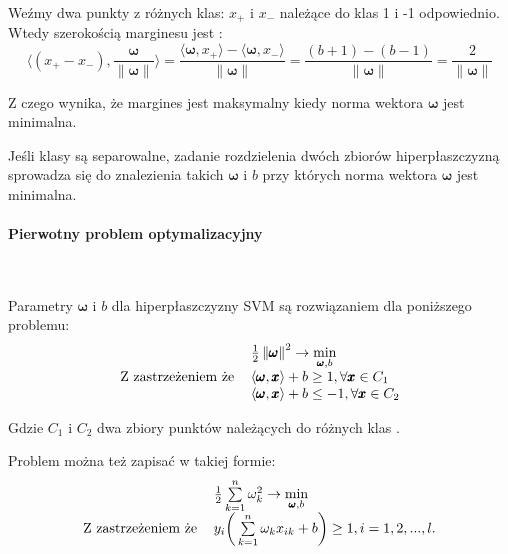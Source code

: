 \documentclass[paper=a4, fontsize=11pt]{scrartcl} %
\numberwithin{equation}{section} %
\numberwithin{figure}{section} %
\newcommand{\norm}[1]{\left\lVert#1\right\rVert}
\newcommand{\myparagraph}[1]{\paragraph{#1}\mbox{}\\}
\begin{document}
    Weźmy dwa punkty z różnych klas: $x_+$ i $x_-$ należące do klas 1 i -1 odpowiednio. Wtedy
    szerokością marginesu jest \cite{woroncow2007lekcii}:
    \begin{equation}
        \bigg\langle (x_+ - x_-), \frac{\pmb{\omega}}{\norm{\pmb{\omega}}} \bigg\rangle
        = \frac{\langle \pmb{\omega}, x_+ \rangle - \langle \pmb{\omega}, x_-\rangle}{\norm{\pmb{\omega}}} 
        = \frac{(b + 1) - ( b - 1)}{\norm{\pmb{\omega}}}
        = \frac{2}{\norm{\pmb{\omega}}}
    \end{equation}
        
    \par Z czego wynika, że margines jest maksymalny kiedy norma wektora
    $\pmb{\omega}$ jest minimalna.  
    \par Jeśli klasy są separowalne, zadanie rozdzielenia dwóch zbiorów hiperpłaszczyzną
    sprowadza się do znalezienia takich $\pmb{\omega}$ i $b$ przy których norma wektora
    $\pmb{\omega}$ jest minimalna.

\myparagraph{Pierwotny problem optymalizacyjny}
    \par Parametry $\pmb{\omega}$ i $b$ dla hiperpłaszczyzny SVM są rozwiązaniem dla poniższego
    problemu:
    \begin{equation}
        \begin{tabular}{rl}
            & $\frac{1}{2}\norm{\pmb{\omega}}^2 \rightarrow \min\limits_{\pmb{\omega},b}$ \\
            Z zastrzeżeniem że & $\langle \pmb{\omega}, \pmb{x} \rangle + b \geq 1, \forall \pmb{x} \in C_1$ \\
                               & $\langle \pmb{\omega}, \pmb{x} \rangle + b \leq -1, \forall \pmb{x} \in C_2$

        \end{tabular}
    \end{equation}

    \par Gdzie $C_1$ i $C_2$ dwa zbiory punktów należących do różnych klas
    \cite{nefedov2016support}.
    \par Problem można też zapisać w takiej formie:
    \begin{equation} \label{eq:primal}
        \begin{tabular}{rl}
            & $\frac{1}{2} \sum\limits_{k=1}^n \omega_{k}^2 \rightarrow \min\limits_{\pmb{\omega},b}$ \\
            Z zastrzeżeniem że & $y_i \bigg(\sum\limits_{k=1}^n \omega_k x_{ik} + b \bigg) \geq
            1, i=1,2,...,l.$
        \end{tabular}
    \end{equation}
\end{document}
